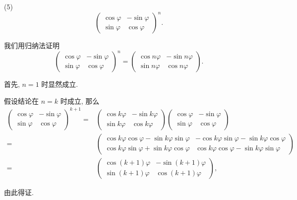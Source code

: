 \begin{problem*}
(5)
\[
\begin{pmatrix}
    \cos \varphi & -\sin \varphi \\
    \sin \varphi & \cos \varphi
\end{pmatrix}^n.
\]
\end{problem*}
\begin{solution}
我们用归纳法证明
\[
    \begin{pmatrix}
        \cos \varphi & -\sin \varphi \\
        \sin \varphi & \cos \varphi
    \end{pmatrix}^n
    =
    \begin{pmatrix}
        \cos n\varphi & -\sin n\varphi \\
        \sin n\varphi & \cos n\varphi
    \end{pmatrix}.
\]

首先, $n = 1$ 时显然成立.

假设结论在 $n = k$ 时成立, 那么
\[
\begin{aligned}
    \begin{pmatrix}
        \cos \varphi & -\sin \varphi \\
        \sin \varphi & \cos \varphi
    \end{pmatrix}^{k + 1}
    ={}&
    \begin{pmatrix}
        \cos k\varphi & -\sin k\varphi \\
        \sin k\varphi & \cos k\varphi
    \end{pmatrix}
    \begin{pmatrix}
        \cos \varphi & -\sin \varphi \\
        \sin \varphi & \cos \varphi
    \end{pmatrix} \\
    ={}&
    \begin{pmatrix}
        \cos k\varphi \cos \varphi - \sin k\varphi \sin \varphi & -\cos k\varphi \sin \varphi - \sin k\varphi \cos \varphi \\
        \cos k\varphi \sin \varphi + \sin k\varphi \cos \varphi & \cos k\varphi \cos \varphi - \sin k\varphi \sin \varphi
    \end{pmatrix} \\
    ={}&
    \begin{pmatrix}
        \cos (k + 1)\varphi & -\sin (k + 1)\varphi \\
        \sin (k + 1)\varphi & \cos (k + 1)\varphi
    \end{pmatrix},
\end{aligned}
\]

由此得证.
\end{solution}

